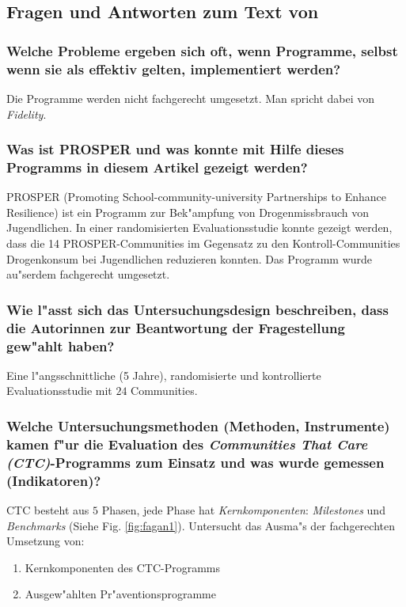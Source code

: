\subsection{Fragen und Antworten zum Text von \textcite{fagan_translational_2009}}
\subsubsection{Welche Probleme ergeben sich oft, wenn Programme, selbst wenn sie als effektiv gelten, implementiert werden?}
Die Programme werden nicht fachgerecht umgesetzt. Man spricht dabei von \emph{Fidelity}.

\subsubsection{Was ist PROSPER und was konnte mit Hilfe dieses Programms in diesem Artikel gezeigt werden?}
PROSPER (Promoting School-community-university Partnerships to Enhance Resilience) ist ein Programm zur Bek"ampfung von Drogenmissbrauch von Jugendlichen. In einer randomisierten Evaluationsstudie konnte gezeigt werden, dass die 14 PROSPER-Communities im Gegensatz zu den Kontroll-Communities Drogenkonsum bei Jugendlichen reduzieren konnten. Das Programm wurde au"serdem fachgerecht umgesetzt.

\subsubsection{Wie l"asst sich das Untersuchungsdesign beschreiben, dass die Autorinnen zur Beantwortung der Fragestellung gew"ahlt haben?}
Eine l"angsschnittliche (5 Jahre), randomisierte und kontrollierte Evaluationsstudie mit $24$ Communities.

\subsubsection{Welche Untersuchungsmethoden (Methoden, Instrumente) kamen f"ur die Evaluation des \emph{Communities That Care (CTC)}-Programms zum Einsatz und was wurde gemessen (Indikatoren)?}
CTC besteht aus $5$ Phasen, jede Phase hat \emph{Kernkomponenten}: \emph{Milestones} und \emph{Benchmarks} (Siehe Fig. \ref{fig:fagan1}). Untersucht das Ausma"s der fachgerechten Umsetzung von:
\begin{enumerate}
        \item Kernkomponenten des CTC-Programms 
        \item Ausgew"ahlten Pr"aventionsprogramme
\end{enumerate}


